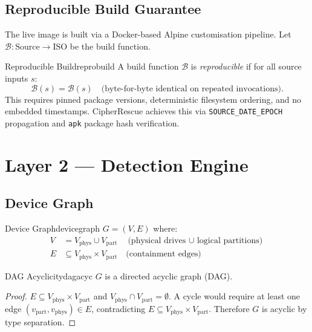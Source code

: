 \documentclass[11pt,a4paper]{report}
\begin{document}
\section{Reproducible Build Guarantee}

The live image is built via a Docker-based Alpine customisation pipeline. Let $\mathcal{B} : \text{Source} \to \text{ISO}$ be the build function.

\begin{definition}{Reproducible Build}{reprobuild}
A build function $\mathcal{B}$ is \emph{reproducible} if for all source inputs $s$:
\[
  \mathcal{B}(s) = \mathcal{B}(s) \quad \text{(byte-for-byte identical on repeated invocations)}.
\]
This requires pinned package versions, deterministic filesystem ordering, and no embedded timestamps. CipherRescue achieves this via \texttt{SOURCE\_DATE\_EPOCH} propagation and \texttt{apk} package hash verification.
\end{definition}

\chapter{Layer 2 --- Detection Engine}

\section{Device Graph}

\begin{definition}{Device Graph}{devicegraph}
$G = (V, E)$ where:
\begin{align*}
  V &= V_{\text{phys}} \cup V_{\text{part}} \quad \text{(physical drives $\cup$ logical partitions)} \\
  E &\subseteq V_{\text{phys}} \times V_{\text{part}} \quad \text{(containment edges)}
\end{align*}
\end{definition}

\begin{proposition}{DAG Acyclicity}{dagacyc}
$G$ is a directed acyclic graph (DAG).
\end{proposition}

\begin{proof}
$E \subseteq V_{\text{phys}} \times V_{\text{part}}$ and $V_{\text{phys}} \cap V_{\text{part}} = \emptyset$. A cycle would require at least one edge $(v_{\text{part}}, v_{\text{phys}}) \in E$, contradicting $E \subseteq V_{\text{phys}} \times V_{\text{part}}$. Therefore $G$ is acyclic by type separation.
\end{proof}
\end{document}
